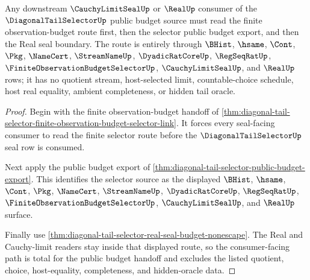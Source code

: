 \begin{theorem}
\label{thm:diagonal-tail-selector-public-budget-route-totality}
Any downstream $\CauchyLimitSealUp$ or $\RealUp$ consumer of the
$\DiagonalTailSelectorUp$ public budget source must read the finite
observation-budget route first, then the selector public budget export, and
then the Real seal boundary. The route is entirely through $\BHist$, $\hsame$,
$\Cont$, $\Pkg$, $\NameCert$, $\StreamNameUp$, $\DyadicRatCoreUp$,
$\RegSeqRatUp$, $\FiniteObservationBudgetSelectorUp$, $\CauchyLimitSealUp$,
and $\RealUp$ rows; it has no quotient stream, host-selected limit,
countable-choice schedule, host real equality, ambient completeness, or hidden
tail oracle.
\end{theorem}
\begin{proof}
Begin with the finite observation-budget handoff of
\autoref{thm:diagonal-tail-selector-finite-observation-budget-selector-link}.
It forces every seal-facing consumer to read the finite selector route before
the $\DiagonalTailSelectorUp$ seal row is consumed.

Next apply the public budget export of
\autoref{thm:diagonal-tail-selector-public-budget-export}. This identifies the
selector source as the displayed $\BHist$, $\hsame$, $\Cont$, $\Pkg$,
$\NameCert$, $\StreamNameUp$, $\DyadicRatCoreUp$, $\RegSeqRatUp$,
$\FiniteObservationBudgetSelectorUp$, $\CauchyLimitSealUp$, and $\RealUp$
surface.

Finally use \autoref{thm:diagonal-tail-selector-real-seal-budget-nonescape}.
The Real and Cauchy-limit readers stay inside that displayed route, so the
consumer-facing path is total for the public budget handoff and excludes the
listed quotient, choice, host-equality, completeness, and hidden-oracle data.
\end{proof}

